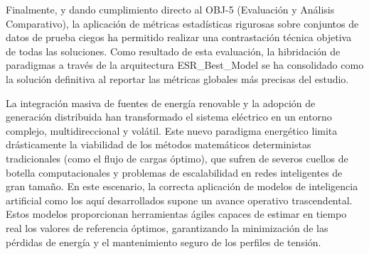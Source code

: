 Finalmente, y dando cumplimiento directo al OBJ-5 (Evaluación y Análisis Comparativo), la aplicación de métricas estadísticas rigurosas sobre conjuntos de datos de prueba ciegos ha permitido realizar una contrastación técnica objetiva de todas las soluciones. Como resultado de esta evaluación, la hibridación de paradigmas a través de la arquitectura ESR\_Best\_Model se ha consolidado como la solución definitiva al reportar las métricas globales más precisas del estudio.

La integración masiva de fuentes de energía renovable y la adopción de generación distribuida han transformado el sistema eléctrico en un entorno complejo, multidireccional y volátil. Este nuevo paradigma energético limita drásticamente la viabilidad de los métodos matemáticos deterministas tradicionales (como el flujo de cargas óptimo), que sufren de severos cuellos de botella computacionales y problemas de escalabilidad en redes inteligentes de gran tamaño. En este escenario, la correcta aplicación de modelos de inteligencia artificial como los aquí desarrollados supone un avance operativo trascendental. Estos modelos proporcionan herramientas ágiles capaces de estimar en tiempo real los valores de referencia óptimos, garantizando la minimización de las pérdidas de energía y el mantenimiento seguro de los perfiles de tensión.

